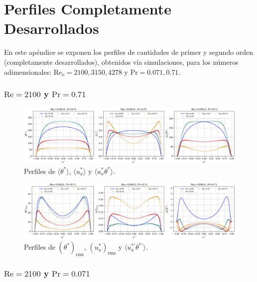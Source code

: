 \chapter{Perfiles Completamente Desarrollados} \label{apen:desarrollado}

En este apéndice se exponen los perfiles de cantidades de primer y segundo orden (completamente desarrollados), obtenidos vía simulaciones, para los números adimensionales: $\text{Re}_o=2100,3150,4278$ y $\text{Pr}=0\text{.}071,0\text{.}71$. 

\subsection*{$\text{Re}=2100$ y $\text{Pr}=0\text{.}71$}

\begin{figure}[H]
  \centering
    \includegraphics[width=\textwidth]{figures/apendices/developed/Re2100-Pr071_merged_phi-ux-uxphi.png}
  \caption{Perfiles de  $\langle \theta^* \rangle$,  $\langle u^*_x \rangle$ y   $\langle u^*_x \theta^* \rangle$.}
  \label{fig:profs-Re2100-Pr071}
\end{figure}

\begin{figure}[H]
  \centering
    \includegraphics[width=\textwidth]{figures/apendices/developed/Re2100-Pr071_merged_phif-uxf-uxphif.png}
  \caption{Perfiles de  $( \theta^*)_{\text{rms}}$,  $(u^*_x)_{\text{rms}}$ y  $\langle u^{* \prime}_x \theta^{* \prime} \rangle$.}
  \label{fig:profs-Re2100-Pr071}
\end{figure}

\subsection*{$\text{Re}=2100$ y $\text{Pr}=0\text{.}071$}

